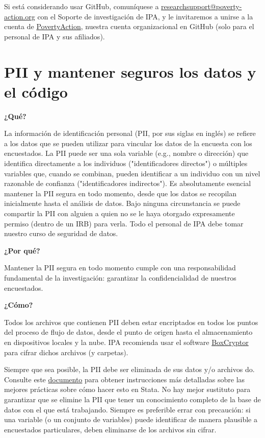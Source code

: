 \documentclass[11pt,en]{elegantpaper}
\begin{document}
Si está considerando usar GitHub, comuníquese a \href{mailto:researchsupport@poverty-action.org}{researchsupport@poverty-action.org} con el Soporte de investigación de IPA, y le invitaremos a unirse a la cuenta de \href{https://github.com/PovertyAction}{PovertyAction}, nuestra cuenta organizacional en GitHub (solo para el personal de IPA y sus afiliados).

\newpage 
\section{PII y mantener seguros los datos y el código}
\label{sec:pii}

\noindent
\textbf{¿Qué?}

La información de identificación personal (PII, por sus siglas en inglés) se refiere a los datos que se pueden utilizar para vincular los datos de la encuesta con los encuestados. La PII puede ser una sola variable (e.g., nombre o dirección) que identifica directamente a los individuos ("identificadores directos") o múltiples variables que, cuando se combinan, pueden identificar a un individuo con un nivel razonable de confianza ("identificadores indirectos"). Es absolutamente esencial mantener la PII segura en todo momento, desde que los datos se recopilan inicialmente hasta el análisis de datos. Bajo ninguna circunstancia se puede compartir la PII con alguien a quien no se le haya otorgado expresamente permiso (dentro de un IRB) para verla. Todo el personal de IPA debe tomar nuestro curso de seguridad de datos.

\noindent
\textbf{¿Por qué?}

Mantener la PII segura en todo momento cumple con una responsabilidad fundamental de la investigación: garantizar la confidencialidad de nuestros encuestados.

\noindent
\textbf{¿Cómo?} 

Todos los archivos que contienen PII deben estar encriptados en todos los puntos del proceso de flujo de datos, desde el punto de origen hasta el almacenamiento en dispositivos locales y la nube. IPA recomienda usar el software \href{https://www.boxcryptor.com/}{BoxCryptor} para cifrar dichos archivos (y carpetas).

Siempre que sea posible, la PII debe ser eliminada de sus datos y/o archivos do. Consulte este \href{http://www.poverty-action.org/research-transparency/pii-searching}{documento} para obtener instrucciones más detalladas sobre las mejores prácticas sobre cómo hacer esto en Stata. No hay mejor sustituto para garantizar que se elimine la PII que tener un conocimiento completo de la base de datos con el que está trabajando. Siempre es preferible errar con precaución: si una variable (o un conjunto de variables) puede identificar de manera plausible a encuestados particulares, deben eliminarse de los archivos sin cifrar.
\end{document}
